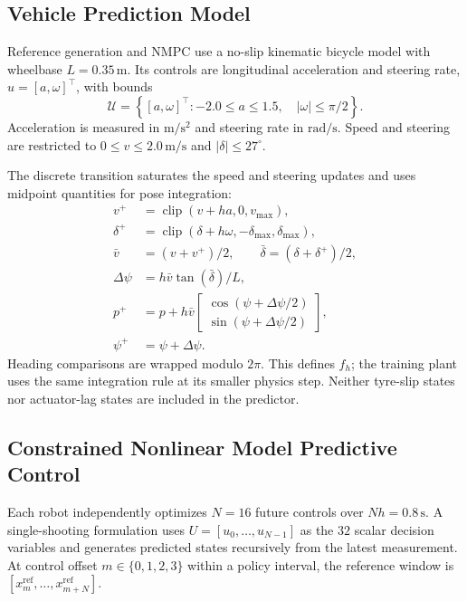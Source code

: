 \subsection{Vehicle Prediction Model}

Reference generation and NMPC use a no-slip kinematic bicycle model with
wheelbase $L=0.35\,\mathrm{m}$. Its controls are longitudinal acceleration
and steering rate, $u=[a,\omega]^\top$, with bounds
\begin{equation}
    \mathcal U=
    \left\{[a,\omega]^\top:
        -2.0\leq a\leq1.5,\quad |\omega|\leq\pi/2\right\}.
\end{equation}
Acceleration is measured in $\mathrm{m/s^2}$ and steering rate in
$\mathrm{rad/s}$. Speed and steering are restricted to
$0\leq v\leq2.0\,\mathrm{m/s}$ and $|\delta|\leq27^\circ$.

The discrete transition saturates the speed and steering updates and uses
midpoint quantities for pose integration:
\begin{align}
    v^+&=\operatorname{clip}(v+ha,0,v_{\max}),\\
    \delta^+&=\operatorname{clip}(\delta+h\omega,-\delta_{\max},\delta_{\max}),\\
    \bar v&=(v+v^+)/2,\qquad \bar\delta=(\delta+\delta^+)/2,\\
    \Delta\psi&=h\bar v\tan(\bar\delta)/L,\\
    p^+&=p+h\bar v
       \begin{bmatrix}\cos(\psi+\Delta\psi/2)\\\sin(\psi+\Delta\psi/2)\end{bmatrix},\\
    \psi^+&=\psi+\Delta\psi.
\end{align}
Heading comparisons are wrapped modulo $2\pi$. This defines $f_h$; the
training plant uses the same integration rule at its smaller physics step.
Neither tyre-slip states nor actuator-lag states are included in the predictor.

\subsection{Constrained Nonlinear Model Predictive Control}

Each robot independently optimizes $N=16$ future controls over
$Nh=0.8\,\mathrm{s}$. A single-shooting formulation uses
$U=[u_0,\ldots,u_{N-1}]$ as the $32$ scalar decision variables and generates
predicted states recursively from the latest measurement. At control offset
$m\in\{0,1,2,3\}$ within a policy interval, the reference window is
$[x_m^{\mathrm{ref}},\ldots,x_{m+N}^{\mathrm{ref}}]$.

